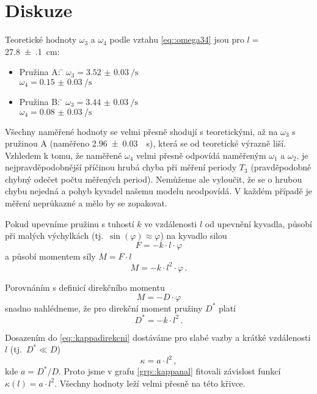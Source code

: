 \section*{Diskuze}
Teoretické hodnoty $\omega_3$ a $\omega_4$ podle vztahu \eqref{eq::omega34} jsou pro $l =$ \SI{27.8(1)}{cm}:
\begin{itemize}
\item \begin{tabbing} Pružina A: \= $\omega_3=\SI{3.52(3)}{\per\s}$	\\ \> $\omega_4=\SI{0.15(3)}{\per\s}$  \end{tabbing}
\item \begin{tabbing} Pružina B: \= $\omega_3=\SI{3.44(3)}{\per\s}$	\\ \> $\omega_4=\SI{0.08(3)}{\per\s}$  \end{tabbing}
\end{itemize}

Všechny naměřené hodnoty se velmi přesně shodují s teoretickými, až na $\omega_3$ s pružinou A (naměřeno \SI{2.96(3)}{\per\s}), která se od teoretické výrazně liší.
Vzhledem k tomu, že naměřené $\omega_4$ velmi přesně odpovídá naměřeným $\omega_1$ a $\omega_2$, je nejpravděpodobnější příčinou hrubá chyba při měření periody $T_3$ (pravděpodobně chybný odečet počtu měřených period).
Nemůžeme ale vyloučit, že se o hrubou chybu nejedná a pohyb kyvadel našemu modelu neodpovídá.
V každém případě je měření neprůkazné a mělo by se zopakovat.

Pokud upevníme pružinu s tuhostí $k$ ve vzdálenosti $l$ od upevnění kyvadla, působí při malých výchylkách (tj.~$\sin (\varphi) \approx \varphi$) na kyvadlo silou
\begin{equation}
F=-k \cdot l \cdot \varphi
\end{equation}
a působí momentem síly $M = F \cdot l$
\begin{equation}
M = -k \cdot l^2 \cdot \varphi  \,.
\end{equation}

Porovnáním s definicí direkčního momentu
\begin{equation}
M = -D \cdot \varphi
\end{equation}
snadno nahlédneme, že pro direkční moment pružiny $D^{\ast}$ platí
\begin{equation}
D^{\ast} = -k \cdot l^2 \,.
\end{equation}

Dosazením do \eqref{eq::kappadirekcni} dostáváme pro slabé vazby a krátké vzdálenosti $l$ (tj.~$D^{\ast} \ll D$)
\begin{equation}
\kappa = a \cdot l^2 \,,
\end{equation}
kde $a = D^{\ast}/D$. Proto jsme v grafu \ref{grp::kappanal} fitovali závislost funkcí $\kappa(l)=a \cdot l^2$. Všechny hodnoty leží velmi přesně na této křivce.
